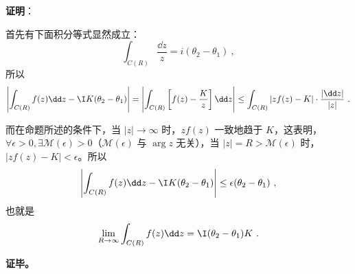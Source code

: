 \textbf{证明}：


首先有下面积分等式显然成立：
$$\int_{C(R)} \frac{\dd z}{z} = i \left(\theta_2 - \theta_1\right) ~,$$
所以
$$\left|\int_{C(R)} f(z) \dd z - \I K (\theta_2 - \theta_1)\right| = \left| \int_{C(R)} \left[ f(z) - \frac{K}{z} \right] \dd z \right| \le \int_{C(R)} \left| z f(z) - K \right| \cdot \frac{|\dd z|}{|z|}~.$$

而在命题所述的条件下，当 $|z| \rightarrow \infty$ 时，$z f(z)$ 一致地趋于 $K$，这表明，$\forall \epsilon > 0, \exists \mathcal M(\epsilon) > 0$（$\mathcal M(\epsilon)$ 与 $\arg z$ 无关），当 $|z| = R > \mathcal M(\epsilon)$ 时，$|zf(z) - K| < \epsilon$。所以
$$\left| \int_{C(R)} f(z) \dd z - \I K(\theta_2 - \theta_1) \right| \le \epsilon (\theta_2 - \theta_1) ~,$$
也就是
$$\lim_{R \rightarrow \infty} \int_{C(R)} f(z) \dd z = \I (\theta_2 - \theta_1) K ~.$$


\textbf{证毕。}













